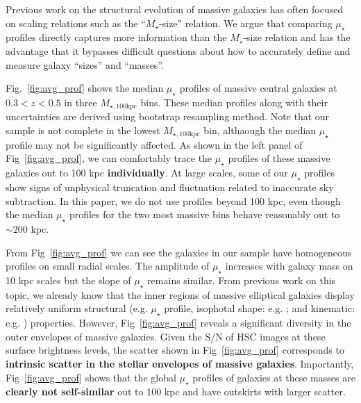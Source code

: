 \documentclass[a4paper,fleqn,usenatbib]{mnras}
\def\mstar{{$M_{\star}$}}
\def\mtot{{$M_{\star,100\mathrm{kpc}}$}}
\def\s2n{{$\mathrm{S}/\mathrm{N}$}}
\def\mden{{$\mu_{\star}$}}
\begin{document}
    Previous work on the structural evolution of massive galaxies has often focused on 
    scaling relations such as the ``\mstar{}-size'' relation.  
    We argue that  comparing \mden{} profiles directly captures more information than
    the \mstar{}-size relation and has the advantage that it bypasses difficult 
    questions about how to accurately define and measure galaxy ``sizes'' and 
    ``masses''.
    
    Fig.~\ref{fig:avg_prof} shows the median \mden{} profiles of massive central 
    galaxies at $0.3 < z < 0.5$ in three \mtot{} bins.
    These median profiles along with their uncertainties are derived using bootstrap
    resampling method. 
    Note that our sample is not complete in the lowest \mtot{} bin, althaough the 
    median \mden{} profile may not be significantly affected. 
    As shown in the left panel of Fig~\ref{fig:avg_prof}, we can comfortably trace
    the \mden{} profiles of these massive galaxies out to 100 kpc \textbf{individually}.  
    At large scales, some of our \mden{} profiles show signs of unphysical truncation and
    fluctuation related to inaccurate sky subtraction. 
    In this paper, we do not use profiles beyond 100 kpc, even though the median 
    \mden{} profiles for the two most massive bins behave reasonably out to 
    ${\sim} 200$ kpc. 
       
    From Fig~\ref{fig:avg_prof} we can see the galaxies in our sample have 
    homogeneous profiles on small radial scales. 
    The amplitude of \mden{} increases with galaxy mass on 10 kpc scales but the slope 
    of \mden{} remains similar.  
    From previous work on this topic, we already know that the inner regions of 
    massive elliptical galaxies display relatively uniform structural (e.g.
    \mden{} profile, isophotal shape: e.g. \citealt{Lauer07, Kormendy2009, 
    Schombert2015}; and kinematic: e.g. \citealt{Cappellari13b}) properties.  
    However, Fig~\ref{fig:avg_prof} reveals a significant diversity in the outer 
    envelopes of massive galaxies.  
    Given the \s2n{} of HSC images at these surface brightness levels, the scatter 
    shown in Fig~\ref{fig:avg_prof} corresponds to \textbf{intrinsic scatter in 
    the stellar envelopes of massive galaxies}. 
    Importantly, Fig~\ref{fig:avg_prof} shows that the global \mden{} profiles 
    of galaxies at these masses are \textbf{clearly not self-similar} out to 100 
    kpc and have outskirts with larger scatter. 
     
\end{document}
